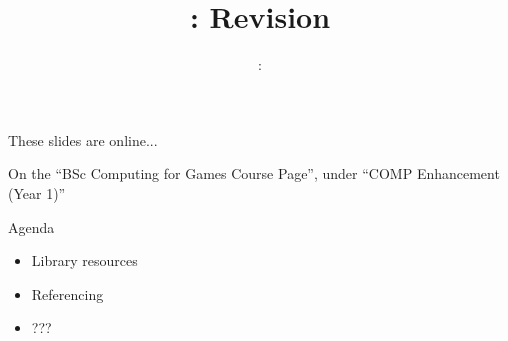 \usepackage{../../beamerthemeFalmouthGamesAcademy}
\usepackage{multimedia}
\graphicspath{ {../../} }

\lstset{language=Python
}

\usepackage[normalem]{ulem}
\usepackage{wasysym}

\usepackage{pdfpages}

\usetikzlibrary{arrows,automata}




\title{\sessionnumber: Revision}
\subtitle{\modulecode: \moduletitle}

\frame{\titlepage} 

\begin{frame}{These slides are online...}
	\begin{center}
		On the ``BSc Computing for Games Course Page'', under ``COMP Enhancement (Year 1)''
	\end{center}
\end{frame}

\begin{frame}{Agenda}
	\begin{itemize}
		\item Library resources
		\item Referencing
		\item ???
	\end{itemize}
\end{frame}





